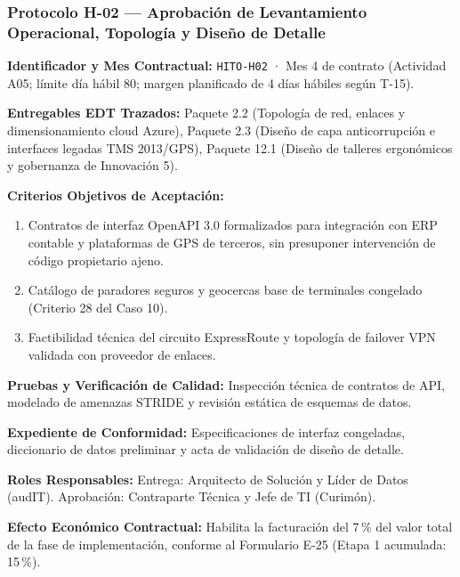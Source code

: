 \subsubsection*{Protocolo H-02 — Aprobación de Levantamiento Operacional, Topología y Diseño de Detalle}\label{sec:9-proto-h2}
\par\noindent\textbf{Identificador y Mes Contractual:} \texttt{HITO-H02} · Mes 4 de contrato (Actividad A05; límite día hábil 80; margen planificado de 4 días hábiles según T-15).\par
\par\noindent\textbf{Entregables EDT Trazados:} Paquete 2.2 (Topología de red, enlaces y dimensionamiento cloud Azure), Paquete 2.3 (Diseño de capa anticorrupción e interfaces legadas TMS 2013/GPS), Paquete 12.1 (Diseño de talleres ergonómicos y gobernanza de Innovación 5).\par
\par\noindent\textbf{Criterios Objetivos de Aceptación:}
\begin{enumerate}
  \item Contratos de interfaz OpenAPI 3.0 formalizados para integración con ERP contable y plataformas de GPS de terceros, sin presuponer intervención de código propietario ajeno.
  \item Catálogo de paradores seguros y geocercas base de terminales congelado (Criterio 28 del Caso 10).
  \item Factibilidad técnica del circuito ExpressRoute y topología de failover VPN validada con proveedor de enlaces.
\end{enumerate}
\par\noindent\textbf{Pruebas y Verificación de Calidad:} Inspección técnica de contratos de API, modelado de amenazas STRIDE y revisión estática de esquemas de datos.\par
\par\noindent\textbf{Expediente de Conformidad:} Especificaciones de interfaz congeladas, diccionario de datos preliminar y acta de validación de diseño de detalle.\par
\par\noindent\textbf{Roles Responsables:} Entrega: Arquitecto de Solución y Líder de Datos (audIT). Aprobación: Contraparte Técnica y Jefe de TI (Curimón).\par
\par\noindent\textbf{Efecto Económico Contractual:} Habilita la facturación del 7\,\% del valor total de la fase de implementación, conforme al Formulario E-25 (Etapa 1 acumulada: 15\,\%).\par

